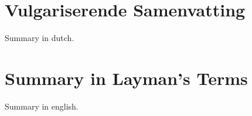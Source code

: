 \chapter*{Vulgariserende Samenvatting}
Summary in dutch.

\cleardoublepage
{}
\chapter*{Summary in Layman's Terms}
Summary in english.
